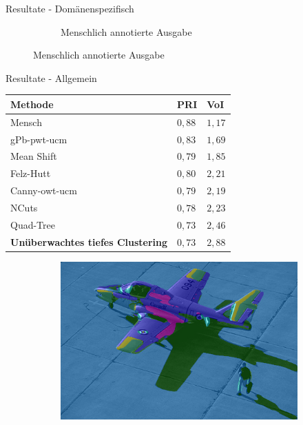 \documentclass{beamer}
\begin{document}
\begin{frame}[allowframebreaks]{Resultate - Domänenspezifisch}
\begin{minipage}{0.38\textwidth}
\begin{figure}[h!]
\begin{subfigure}[t]{0.31\textwidth}
				\caption{Menschlich annotierte Ausgabe}
			\end{subfigure}
		\end{figure}
	\end{minipage}
\end{frame}

\begin{frame}{Resultate - Allgemein}
	\begin{minipage}{0.6\textwidth}
		\footnotesize
		\begin{table}[h!]
			\begin{tabularx}{\textwidth}{p{} >{\centering} p{} >{\centering\arraybackslash} p{}}
				\toprule
				\textbf{Methode} & \textbf{PRI\footnotemark[4]} & \textbf{VoI\footnotemark[4]} \\
				\midrule
				Mensch \cite{bsd500} & $0,88$ & $1,17$ \\
				\midrule
				gPb-pwt-ucm \cite{arbelaez_10} & $0,83$ & $1,69$ \\
				Mean Shift \cite{comaniciu_02} & $0,79$ & $1,85$ \\
				Felz-Hutt \cite{felzenszwalb_04} & $0,80$ & $2,21$ \\
				Canny-owt-ucm \cite{arbelaez_10} & $0,79$ & $2,19$ \\
				NCuts \cite{cour_05} & $0,78$ & $2,23$ \\
				Quad-Tree & $0,73$ & $2,46$ \\
				\textbf{Unüberwachtes tiefes Clustering} & $0,73$ & $2,88$ \\
				\bottomrule
			\end{tabularx}
		\end{table}
	\end{minipage}
	\hfill
	\begin{minipage}{0.28\textwidth}
		\begin{figure}[h!]
			\begin{subfigure}{\textwidth}
				\includegraphics[width=\linewidth,keepaspectratio]{gfx/37073.jpg_seg.png}

\end{subfigure}
\end{figure}
\end{minipage}
\end{frame}
\end{document}
